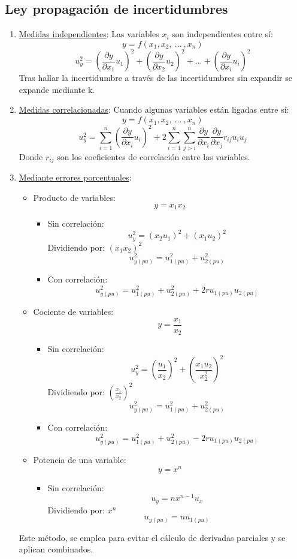 \subsection{Ley propagación de incertidumbres}
\begin{enumerate}
	\item \underline{Medidas independientes}: Las variables $x_i$ son independientes entre sí:
	\[y=f(x_1,x_2,\ ... \ ,x_n)\]
	\[u^2_y=  \left({\frac{\partial y}{\partial x_1}u_1}\right)^2 +
	\left({\frac{\partial y}{\partial x_2} u_2}\right)^2 + ... +
	\left({\frac{\partial y}{\partial x_i}u_i}\right)^2\]
	Tras hallar la incertidumbre a través de las incertidumbres sin expandir se expande mediante k.
	\item \underline{Medidas correlacionadas}: Cuando algunas variables están ligadas entre sí:
	\[y=f(x_1,x_2,\ ... \ ,x_n)\]
	\[u^2_y=   \sum_{i=1}^{n} \left({\frac{\partial y}{\partial x_i}u_i}\right)^2 + 2 \sum_{i=1}^{n} \sum_{j>i}^{n} \frac{\partial y}{\partial x_i} \frac{\partial y}{\partial x_j} r_{ij} u_i u_j
	\]
	Donde $r_{ij}$ son los coeficientes de correlación entre las variables.
	\item \underline{Mediante errores porcentuales}:
		\begin{itemize}
			\item Producto de variables:
			\[y= x_1 x_2\]
			\begin{itemize}		
				\item Sin correlación:
				\[u_y^2=  ({x_2 u_1})^2 +({x_1 u_2})^2\]
				Dividiendo por: $(x_1 x_2)^2$
				\[u_{y(pu)}^2=   u_{1(pu)}^2 +u_{2(pu)}^2\]
				\item Con correlación:
				\[u_{y(pu)}^2=   u_{1(pu)}^2 +u_{2(pu)}^2+2ru_{1(pu)}u_{2(pu)}\]
			\end{itemize}
			\item Cociente de variables:
			\[y= \frac{x_1} {x_2}\]
			\begin{itemize}
				\item Sin correlación:
				\[u_y^2=  \left({\frac{ u_1}{x_2}}\right)^2 +\left({\frac {x_1 u_2}{x_2^2}}\right)^2\]
				Dividiendo por: $\left({\frac{ x_1}{x_2}}\right)^2$
				\[u_{y(pu)}^2=   u_{1(pu)}^2 +u_{2(pu)}^2\]
				\item Con correlación:
				\[u_{y(pu)}^2=   u_{1(pu)}^2 +u_{2(pu)}^2-2ru_{1(pu)}u_{2(pu)}\]
			\end{itemize}
			\item Potencia de una variable:
			\[y= x^n\]
			\begin{itemize}
				\item Sin correlación:
					\[u_y=n x^{n-1}u_x\]
				Dividiendo por: $ x^{n}$
				\[u_{y(pu)}=  n u_{1(pu)}\]

			\end{itemize}
		\end{itemize}
		Este método, se emplea para evitar el cálculo de derivadas parciales y se aplican combinados.
\end{enumerate}
